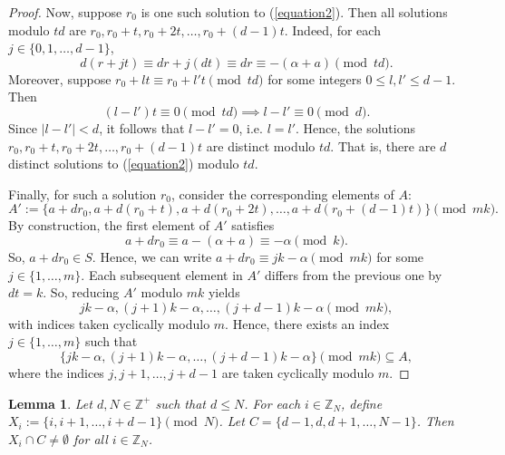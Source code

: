 \documentclass{article}
\newtheorem{lemma}[theorem]{Lemma}
\theoremstyle{definition}
\theoremstyle{remark}
\begin{document}
\begin{proof}
Now, suppose $r_0$ is one such solution to (\ref{equation2}). Then all solutions modulo $td$ are $r_0,r_0+t,r_0+2t,\ldots,r_0+(d-1)t$. Indeed, for each $j \in \{0,1,\ldots,d-1\}$, \begin{equation*}
    d(r+jt) \equiv dr+j(dt) \equiv dr \equiv -(\alpha+a) \pmod {td}.
\end{equation*} Moreover, suppose $r_0+lt \equiv r_0+l't \pmod {td}$ for some integers $0 \leq l,l' \leq d-1$. Then \begin{equation*}
    (l-l')t \equiv 0 \pmod {td} \implies l-l' \equiv 0 \pmod d.
\end{equation*} Since $|l-l'| < d$, it follows that $l-l' = 0$, i.e. $l=l'$. Hence, the solutions $r_0,r_0+t,r_0+2t,\ldots,r_0+(d-1)t$ are distinct modulo $td$. That is, there are $d$ distinct solutions to (\ref{equation2}) modulo $td$.

Finally, for such a solution $r_0$, consider the corresponding elements of $A$: \begin{equation*}
    A' :=\{a+dr_0,a+d(r_0+t),a+d(r_0+2t),\ldots,a+d(r_0+(d-1)t)\} \pmod {mk}.
\end{equation*} By construction, the first element of $A'$ satisfies \begin{equation*}
    a+dr_0 \equiv a-(\alpha+a) \equiv -\alpha \pmod k.
\end{equation*} So, $a+dr_0 \in S$. Hence, we can write $a+dr_0 \equiv jk-\alpha \pmod {mk}$ for some $j \in \{1,\ldots,m\}$. Each subsequent element in $A'$ differs from the previous one by $dt = k$. So, reducing $A'$ modulo $mk$ yields \begin{equation*}
    jk-\alpha, (j+1)k-\alpha,\ldots,(j+d-1)k-\alpha \pmod {mk},
\end{equation*} with indices taken cyclically modulo $m$. Hence, there exists an index $j \in \{1,\ldots,m\}$ such that \begin{equation*}
    \{jk-\alpha,(j+1)k-\alpha,\ldots,(j+d-1)k-\alpha\} \pmod {mk} \subseteq A,
\end{equation*} where the indices $j,j+1,\ldots,j+d-1$ are taken cyclically modulo $m$.
\end{proof}

\begin{lemma}
\label{lem:nonemptycon}
    Let $d,N \in \mathbb{Z}^+$ such that $d \leq N$. For each $i \in \mathbb{Z}_{N}$, define $X_{i} := \{i,i+1,\ldots,i+d-1\} \pmod N$. Let $C = \{d-1,d,d+1,\ldots,N-1\}$. Then $X_i \cap C \neq \emptyset$ for all $i \in \mathbb{Z}_N$.
\end{lemma}
\end{document}
